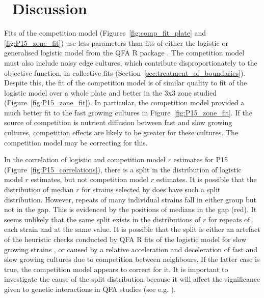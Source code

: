 \graphicspath{{images/}}

\section{\thesection~Discussion}
\label{sec:discussion}

Fits of the competition model (Figures~\ref{fig:comp_fit_plate} and
\ref{fig:P15_zone_fit}) use less parameters than fits of either the
logistic or generalised logistic model from the QFA R package
\citep{qfa2016}. The competition model must also include noisy edge
cultures, which contribute disproportionately to the objective
function, in collective fits
(Section~\ref{sec:treatment_of_boundaries}). Despite this, the fit of
the competition model is of similar quality to fit of the logistic
model over a whole plate and better in the 3x3 zone studied
(Figure~\ref{fig:P15_zone_fit}). In particular, the competition model
provided a much better fit to the fast growing cultures in
Figure~\ref{fig:P15_zone_fit}. If the source of competition is
nutrient diffusion between fast and slow growing cultures, competition
effects are likely to be greater for these cultures. The competition
model may be correcting for this.

In the correlation of logistic and competition model \(r\) estimates
for P15 (Figure~\ref{fig:P15_correlations}), there is a split in the
distribution of logistic model \(r\) estimates, but not competition
model \(r\) estimates. It is possible that the distribution of median
\(r\) for strains selected by \citet{Addinall2011} does have such a
split distribution. However, repeats of many individual strains fall
in either group but not in the gap. This is evidenced by the positions
of medians in the gap (red). It seems unlikely that the same split
exists in the distributions of \(r\) for repeats of each strain and at
the same value. It is possible that the split is either an artefact of
the heuristic checks conducted by QFA R fits of the logistic model for
slow growing strains \citep{qfa2016}, or caused by a relative
acceleration and deceleration of fast and slow growing cultures due to
competition between neighbours. If the latter case is true, the
competition model appears to correct for it. It is important to
investigate the cause of the split distribution because it will affect
the significance given to genetic interactions in QFA studies (see
e.g. \citet{Addinall2011}).

